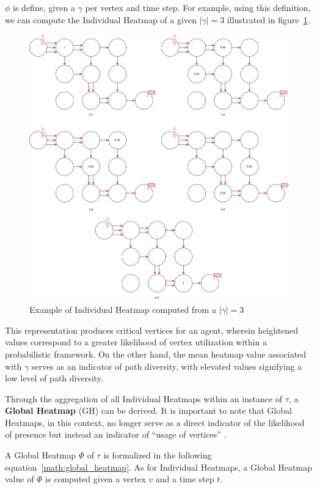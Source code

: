\(\phi\) is define, given a \(\gamma\) per vertex and time step. For example, using this definition, we can compute the Individual Heatmap of a given \(|\gamma|=3\) illustrated in figure~\ref{fig:individual_heatmap}.

\begin{figure}[H]
    \centering
    \caption{Example of Individual Heatmap computed from a \(|\gamma|=3\)}\label{fig:individual_heatmap}
    \includegraphics[width=\widthimg]{img/individual_heatmap.drawio.png}
\end{figure}

This representation produces critical vertices for an agent, wherein heightened values correspond to a greater likelihood of vertex utilization within a probabilistic framework. On the other hand, the mean heatmap value associated with \(\gamma\) serves as an indicator of path diversity, with elevated values signifying a low level of path diversity.

Through the aggregation of all Individual Heatmaps within an instance of \(\tau\), a \textbf{Global Heatmap} (GH) can be derived. It is important to note that Global Heatmaps, in this context, no longer serve as a direct indicator of the likelihood of presence but instead an indicator of ``usage of vertices'' .

A Global Heatmap \(\Phi\) of \(\tau\) is formalized in the following equation~\ref{math:global_heatmap}. As for Individual Heatmaps, a Global Heatmap value of \(\Phi\) is computed given a vertex \(v\) and a time step \(t\).  

